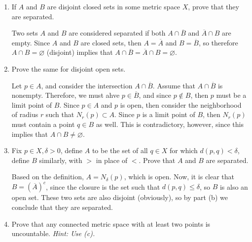 \documentclass[10pt]{article}
\begin{document}
	\begin{problem}
		\begin{enumerate}[label=\alph*)]
			\item If \( A \) and \( B \) are disjoint closed sets in some metric space \( X \), prove 
				that they are separated. 

				\begin{solution}
					Two sets \( A \) and \( B \) are considered separated if both \( A \cap \overline B \) and 
					\( \overline A \cap B \) are empty. Since \( A \) and \( B \) are closed sets, 
					then \( A = \overline A \) and \( B = \overline B \), so therefore 
					\( A \cap B = \varnothing \) (disjoint) implies that \( A \cap \overline B = 
					\overline A \cap B = \varnothing \). 
				\end{solution}
			\item Prove the same for disjoint open sets. 

				\begin{solution}
					Let \( p \in A \), and consider the intersection \( A \cap \overline B \). Assume that 
					\( A \cap \overline B \) is nonempty. Therefore, we must ahve \( p \in \overline B \), and 
					since \( p \not \in B \), then \( p \) must be a limit point of \( B \). Since \( p \in A \)  
					and \( p \) is open, then consider the neighborhood of radius \( r \) such that 
					\( N_r(p) \subset A\). Since \( p \) is a limit point of \( B \), then \( N_r(p) \) must contain 
					a point \( q \in B \) as well. This is contradictory, however, since this implies that 
					\( A \cap B \neq \varnothing \). 
				\end{solution}
			\item Fix \( p \in X, \delta > 0 \), define \( A \) to be the set of all \( q \in X \) for 
				which \( d(p, q) < \delta \), define \( B \) similarly, with \( >  \) in place of \( < \). Prove 
				that \( A \) and \( B \) are separated. 

				\begin{solution}
					Based on the definition, \( A = N_{\delta}(p) \), which is open. Now, it is clear 
					that \( B = (\overline {A})^{c} \), since the closure is the set such that 
					\( d(p, q) \le \delta \), so \( B \) is also an open set. These two sets 
					are also disjoint (obviously), so by part (b) we conclude that they are separated. 
				\end{solution}
			\item Prove that any connected metric space with at least two points is uncountable. 
				\textit{Hint: Use (c).}


\end{enumerate}
\end{problem}
\end{document}
